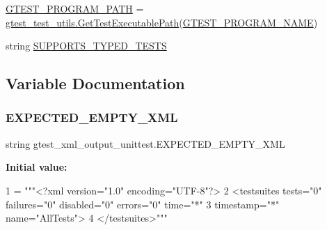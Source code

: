 \begin{DoxyCompactItemize}
\item 
\hyperlink{namespacegtest__xml__output__unittest_a8c4cf6e9b6a184278a1b2759e5eaec6b}{G\+T\+E\+S\+T\+\_\+\+P\+R\+O\+G\+R\+A\+M\+\_\+\+P\+A\+TH} = \hyperlink{namespacegtest__test__utils_a89ed3717984a80ffbb7a9c92f71b86a2}{gtest\+\_\+test\+\_\+utils.\+Get\+Test\+Executable\+Path}(\hyperlink{namespacegtest__xml__output__unittest_ab89cc5b402310ef67bcaf38fa5017461}{G\+T\+E\+S\+T\+\_\+\+P\+R\+O\+G\+R\+A\+M\+\_\+\+N\+A\+ME})
\item 
string \hyperlink{namespacegtest__xml__output__unittest_a07eecd027d660022c0ab447f3c3e0f2e}{S\+U\+P\+P\+O\+R\+T\+S\+\_\+\+T\+Y\+P\+E\+D\+\_\+\+T\+E\+S\+TS}
\end{DoxyCompactItemize}


\subsection{Variable Documentation}
\mbox{\label{namespacegtest__xml__output__unittest_abe1569d019b037f006986004349c7cf3}} 
\subsubsection{\texorpdfstring{E\+X\+P\+E\+C\+T\+E\+D\+\_\+\+E\+M\+P\+T\+Y\+\_\+\+X\+ML}{EXPECTED\_EMPTY\_XML}}
{\footnotesize\ttfamily string gtest\+\_\+xml\+\_\+output\+\_\+unittest.\+E\+X\+P\+E\+C\+T\+E\+D\+\_\+\+E\+M\+P\+T\+Y\+\_\+\+X\+ML}

{\bfseries Initial value\+:}
\begin{DoxyCode}
1 =  \textcolor{stringliteral}{"""<?xml version="1.0" encoding="UTF-8"?>}
2 \textcolor{stringliteral}{<testsuites tests="0" failures="0" disabled="0" errors="0" time="*"}
3 \textcolor{stringliteral}{            timestamp="*" name="AllTests">}
4 \textcolor{stringliteral}{</testsuites>"""}
\end{DoxyCode}
\mbox{\label{namespacegtest__xml__output__unittest_a1adb060422f833cb8b99403d13144399}} 
